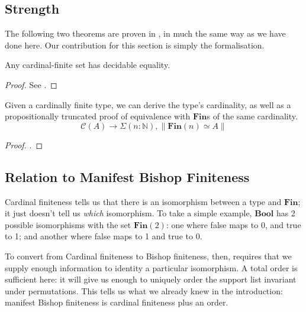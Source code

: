 \subsection{Strength}
The following two theorems are proven in
\cite{yorgeyCombinatorialSpeciesLabelled2014}, in much the same way as we have
done here.
Our contribution for this section is simply the formalisation.
\begin{rm-theorem} \label{cardinal-finite-discrete}
  Any cardinal-finite set has decidable equality.
\end{rm-theorem}
\begin{proof}
  See \cite[Proposition 2.4.10]{yorgeyCombinatorialSpeciesLabelled2014}.
\end{proof}
\begin{rm-theorem}
  Given a cardinally finite type, we can derive the type's cardinality, as well
  as a propositionally truncated proof of equivalence with \(\textbf{Fin}\)s of
  the same cardinality.
  \begin{equation}
    \mathcal{C}(A) \rightarrow \Sigma {(n : \mathbb{N})} , \lVert \textbf{Fin}(n) \simeq A \rVert
  \end{equation}
\end{rm-theorem}
\begin{proof}
  \cite[Proposition 2.4.9]{yorgeyCombinatorialSpeciesLabelled2014}.
\end{proof}
\subsection{Relation to Manifest Bishop Finiteness}
Cardinal finiteness tells us that there is an isomorphism between a type and
\(\mathbf{Fin}\); it just doesn't tell us \emph{which} isomorphism.
To take a simple example, \(\mathbf{Bool}\) has 2 possible isomorphisms with the
set \(\mathbf{Fin}(2)\): one where false maps to 0, and true to 1; and another
where false maps to 1 and true to 0.

To convert from Cardinal finiteness to Bishop finiteness, then, requires that we
supply enough information to identity a particular isomorphism.
A total order is sufficient here: it will give us enough to uniquely order the
support list invariant under permutations.
This tells us what we already knew in the introduction: manifest Bishop
finiteness is cardinal finiteness plus an order.

